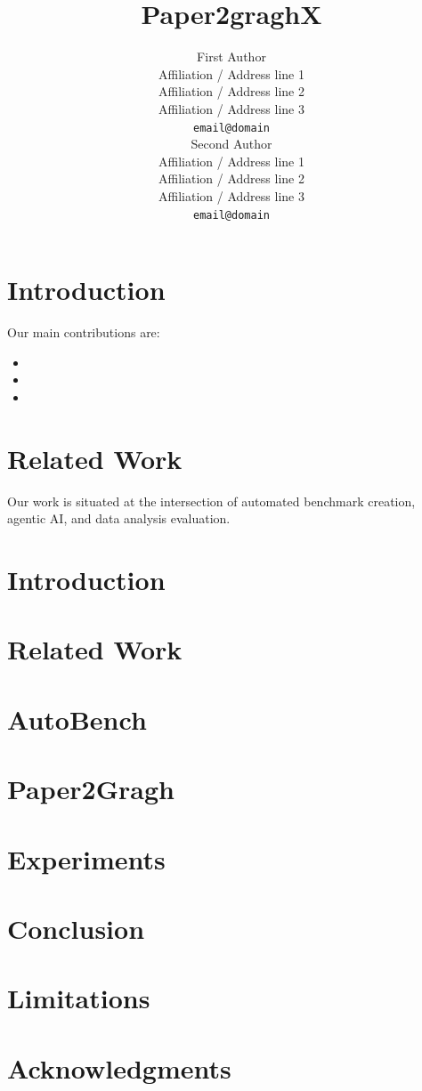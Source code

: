 \documentclass[11pt]{article}
\title{Paper2graghX}
\author{First Author \\
  Affiliation / Address line 1 \\
  Affiliation / Address line 2 \\
  Affiliation / Address line 3 \\
  \texttt{email@domain} \\\And
  Second Author \\
  Affiliation / Address line 1 \\
  Affiliation / Address line 2 \\
  Affiliation / Address line 3 \\
  \texttt{email@domain} \\}
\begin{document}
\maketitle
\begin{abstract}
\end{abstract}

\section{Introduction}
\label{sec:intro}


Our main contributions are:
\begin{itemize}
    \item 
    \item 
    \item 
\end{itemize}


\section{Related Work}
\label{sec:related_work}

Our work is situated at the intersection of automated benchmark creation, agentic AI, and data analysis evaluation.

\section{Introduction}

\section{Related Work}

\section{AutoBench}

\section{Paper2Gragh}

\section{Experiments}

\section{Conclusion}

\section*{Limitations}

\section*{Acknowledgments}
\end{document}
